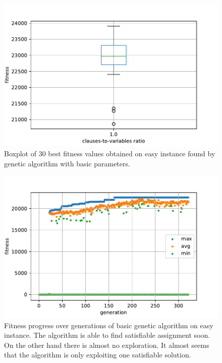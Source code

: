 \documentclass{article}
\begin{document}
\begin{figure}[ht]
\vskip 0.2in
\begin{center}
\centerline{\includegraphics[width=\columnwidth]{figs/basic-boxplot}}
\caption{Boxplot of 30 best fitness values obtained on easy instance found
by genetic algorithm with basic parameters.}
\label{basic-boxplot}
\end{center}
\vskip -0.2in
\end{figure}

\begin{figure}[ht]
\vskip 0.2in
\begin{center}
\centerline{\includegraphics[width=\columnwidth]{figs/basic-progress}}
\caption{Fitness progress over generations of basic genetic algorithm on
easy instance. The algorithm is able to find satisfiable assignment soon.
On the other hand there is almost no exploration.
It almost seems that the algorithm is only exploiting one satisfiable solution.}
\label{basic-progress}
\end{center}
\vskip -0.2in
\end{figure}
\end{document}
